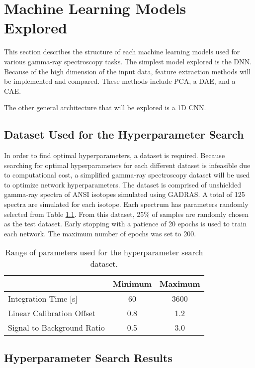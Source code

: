 \chapter{Machine Learning Models Explored}

This section describes the structure of each machine learning models used for various gamma-ray spectroscopy tasks. The simplest model explored is the DNN. Because of the high dimension of the input data, feature extraction methods will be implemented and compared. These methods include PCA, a DAE, and a CAE. 

The other general architecture that will be explored is a 1D CNN. 


\section{Dataset Used for the Hyperparameter Search}

In order to find optimal hyperparameters, a dataset is required. Because searching for optimal hyperparameters for each different dataset is infeasible due to computational cost, a simplified gamma-ray spectroscopy dataset will be used to optimize network hyperparameters. The dataset is comprised of unshielded gamma-ray spectra of ANSI isotopes simulated using GADRAS. A total of 125 spectra are simulated for each isotope. Each spectrum has parameters randomly selected from Table \ref{table:hyperparameter_dataset_parameters}. From this dataset, 25\% of samples are randomly chosen as the test dataset. Early stopping with a patience of 20 epochs is used to train each network. The maximum number of epochs was set to 200.

\begin{table}[H]
\centering
\caption{Range of parameters used for the hyperparameter search dataset.}
\label{table:hyperparameter_dataset_parameters}
\begin{tabular}{l|c|c|}
\cline{2-3}
 & \multicolumn{1}{r|}{Minimum} & \multicolumn{1}{l|}{Maximum} \\ \hline
\multicolumn{1}{|l|}{Integration Time {[}s{]}} & 60 & 3600 \\ \hline
\multicolumn{1}{|l|}{Linear Calibration Offset} & 0.8 & 1.2 \\ \hline
\multicolumn{1}{|l|}{Signal to Background Ratio} & 0.5 & 3.0 \\ \hline
\end{tabular}
\end{table}


\section{Hyperparameter Search Results}

